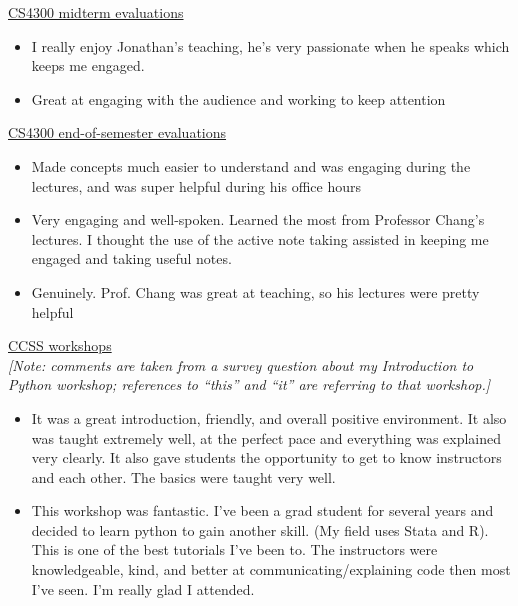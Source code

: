 \documentclass[12pt,letterpaper]{article}
\begin{document}

\noindent\underline{CS4300 midterm evaluations}
\begin{itemize}
    \item I really enjoy Jonathan's teaching, he's very passionate when he speaks which keeps me engaged.
    \item Great at engaging with the audience and working to keep attention
\end{itemize}

\noindent\underline{CS4300 end-of-semester evaluations}
\begin{itemize}
    \item Made concepts much easier to understand and was engaging during the lectures, and was super helpful during his office hours
    \item Very engaging and well-spoken. Learned the most from Professor Chang's lectures. I thought the use of the active note taking assisted in keeping me engaged and taking useful notes.
    \item Genuinely. Prof. Chang was great at teaching, so his lectures were pretty helpful
\end{itemize}

\noindent\underline{CCSS workshops}\\
\emph{[Note: comments are taken from a survey question about my Introduction to Python workshop; references to ``this'' and ``it'' are referring to that workshop.]}
\begin{itemize}
    \item It was a great introduction, friendly, and overall positive environment. It also was taught extremely well, at the perfect pace and everything was explained very clearly. It also gave students the opportunity to get to know instructors and each other. The basics were taught very well.
    \item This workshop was fantastic. I've been a grad student for several years and decided to learn python to gain another skill. (My field uses Stata and R). This is one of the best tutorials I've been to. The instructors were knowledgeable, kind, and better at communicating/explaining code then most I've seen. I'm really glad I attended.
\end{itemize}

\else
%
\fi
\end{document}
